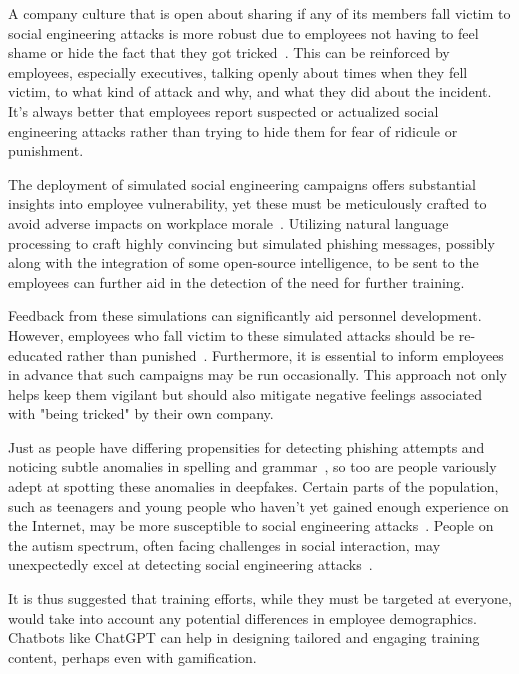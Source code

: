 A company culture that is open about sharing if any of its members fall victim to social engineering attacks is more robust due to employees not having to feel shame or hide the fact that they got tricked~\citep{hadnagy_Social_Engineering_The_Science_2018}. This can be reinforced by employees, especially executives, talking openly about times when they fell victim, to what kind of attack and why, and what they did about the incident. It's always better that employees report suspected or actualized social engineering attacks rather than trying to hide them for fear of ridicule or punishment.

The deployment of simulated social engineering campaigns offers substantial insights into employee vulnerability, yet these must be meticulously crafted to avoid adverse impacts on workplace morale~\citep{mitnick_The_Art_of_Deception_2003}. Utilizing natural language processing to craft highly convincing but simulated phishing messages, possibly along with the integration of some open-source intelligence, to be sent to the employees can further aid in the detection of the need for further training.

Feedback from these simulations can significantly aid personnel development. However, employees who fall victim to these simulated attacks should be re-educated rather than punished~\citep{mitnick_The_Art_of_Deception_2003}. Furthermore, it is essential to inform employees in advance that such campaigns may be run occasionally. This approach not only helps keep them vigilant but should also mitigate negative feelings associated with "being tricked" by their own company.

%
%
Just as people have differing propensities for detecting phishing attempts and noticing subtle anomalies in spelling and grammar~\citep{nicholson_Investigating_Teenagers_Detect_Phishing_2020, neupane_Social_Disorders_Facilitate_SE_2018}, so too are people variously adept at spotting these anomalies in deepfakes. Certain parts of the population, such as teenagers and young people who haven't yet gained enough experience on the Internet, may be more susceptible to social engineering attacks~\citep{nicholson_Investigating_Teenagers_Detect_Phishing_2020}. People on the autism spectrum, often facing challenges in social interaction, may unexpectedly excel at detecting social engineering attacks~\citep{neupane_Social_Disorders_Facilitate_SE_2018}.

It is thus suggested that training efforts, while they must be targeted at everyone, would take into account any potential differences in employee demographics. Chatbots like ChatGPT can help in designing tailored and engaging training content, perhaps even with gamification.



